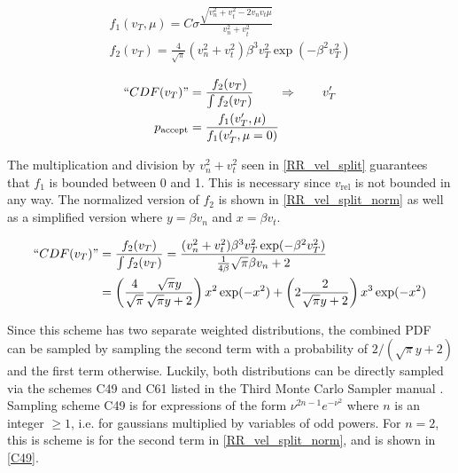 \begin{equation}
\label{RR_vel_split}
\begin{gathered}
f_1(v_T,\mu) = C \sigma  \frac{\sqrt{v_n^2+v_t^2-2 v_n v_t \mu}}{v_n^2+v_t^2}\\
f_2(v_T) =  \frac{4}{\sqrt{\pi}} (v_n^2+v_t^2) \beta^3 v_T^2  \exp ( -\beta^2  v_T^2 )
\end{gathered}
\end{equation}

\begin{equation}
\label{RR_vel_split_samp}
\begin{split}
``CDF(v_T)" &= \frac{f_2(v_T)}{\int f_2(v_T)} \qquad \Rightarrow \qquad v_T^\prime  \\
p_\mathrm{accept} &= \frac{f_1(v_T^\prime,\mu)}{ f_1(v_T^\prime,\mu=0)}
\end{split}
\end{equation}

The multiplication and division by $v_n^2+v_t^2$ seen in \eqref{RR_vel_split} guarantees that $f_1$ is bounded between 0 and 1.  This is necessary since $v_\mathrm{rel}$ is not bounded in any way.  The normalized version of $f_2$ is shown in \eqref{RR_vel_split_norm} as well as a simplified version where $y=\beta v_n$ and $x=\beta v_t$.

\begin{equation}
\label{RR_vel_split_norm}
\begin{split}
``CDF(v_T)" &=  \frac{f_2(v_T)}{\int f_2(v_T)} = \frac{  (v_n^2+v_t^2) \beta^3 v_T^2  \exp ( -\beta^2  v_T^2 ) }{ \frac{1}{4\beta} \sqrt{\pi} \beta v_n +2 } \\
&= \left( \frac{4}{\sqrt{\pi}}  \frac{\sqrt{\pi}y}{\sqrt{\pi}y+2} \right) x^2 \exp(-x^2)  + \left( 2  \frac{2}{\sqrt{\pi}y+2} \right) x^3 \exp(-x^2) \\
\end{split}
\end{equation}

Since this scheme has two separate weighted distributions, the combined PDF can be sampled by sampling the second term with a probability of $2/(\sqrt{\pi}y+2)$ and the first term otherwise.  Luckily, both distributions can be directly sampled via the schemes C49 and C61 listed in the Third Monte Carlo Sampler manual \cite{3rdsampler}.  Sampling scheme C49 is for expressions of the form $\nu^{2n-1}e^{-\nu^2}$ where $n$ is an integer $\ge 1$, i.e. for gaussians multiplied by variables of odd powers.  For $n=2$, this is scheme is for the second term in \eqref{RR_vel_split_norm}, and is shown in \eqref{C49}.

